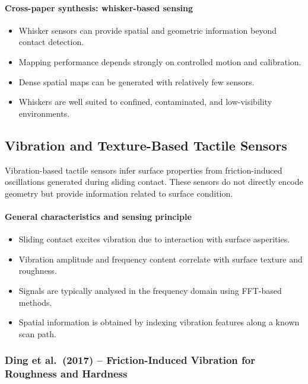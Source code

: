 \documentclass[11pt,a4paper]{article}
\begin{document}
\paragraph{Cross-paper synthesis: whisker-based sensing}
\begin{itemize}
    \item Whisker sensors can provide spatial and geometric information beyond contact detection.
    \item Mapping performance depends strongly on controlled motion and calibration.
    \item Dense spatial maps can be generated with relatively few sensors.
    \item Whiskers are well suited to confined, contaminated, and low-visibility environments.
\end{itemize}

\subsection{Vibration and Texture-Based Tactile Sensors}

Vibration-based tactile sensors infer surface properties from friction-induced oscillations generated during sliding contact. These sensors do not directly encode geometry but provide information related to surface condition.

\paragraph{General characteristics and sensing principle}
\begin{itemize}
    \item Sliding contact excites vibration due to interaction with surface asperities.
    \item Vibration amplitude and frequency content correlate with surface texture and roughness.
    \item Signals are typically analysed in the frequency domain using FFT-based methods.
    \item Spatial information is obtained by indexing vibration features along a known scan path.
\end{itemize}

\subsubsection*{Ding et al.\ (2017) -- Friction-Induced Vibration for Roughness and Hardness}
\end{document}
